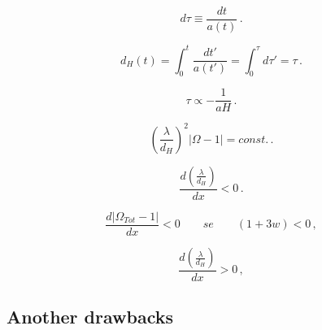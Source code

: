 \begin{equation}
d\tau \equiv \dfrac{dt}{a(t)}\, .
\label{equation:1.5.11}
\end{equation}

\begin{equation}
d_H (t) = \int_0^t \frac{dt'}{a(t')} = \int_0^{\tau} d\tau' = \tau \, .
\label{equation:1.5.12}
\end{equation}

\begin{equation}
\tau \propto -\frac{1}{a H} \, .
\label{equation:1.5.13}
\end{equation}

\begin{equation}
\left( \frac{\lambda}{d_H}\right)^2 |\Omega - 1 |=const. \, .
\label{equation:1.5.14}
\end{equation}

\begin{equation}
\dfrac{d (\frac{\lambda}{d_H})}{dx} < 0\, .
\label{equation:1.5.15}
\end{equation}

\begin{equation}
\dfrac{d | \Omega_{Tot} - 1 |}{d x} < 0 \qquad se \qquad (1+ 3 w) < 0\, ,
\label{equation:1.5.16}
\end{equation}   

\begin{equation}
\dfrac{d (\frac{\lambda}{d_H})}{dx} > 0\, ,
\label{equation:1.5.17}
\end{equation}

\subsection{Another drawbacks}
\label{subsection:1.5.3}

